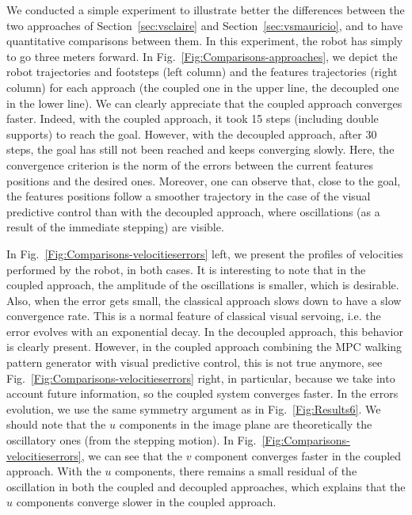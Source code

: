 We conducted a simple experiment to illustrate better the differences between the two approaches of Section~\ref{sec:vsclaire} and Section~\ref{sec:vsmauricio}, and to have quantitative comparisons between them. In this experiment, the robot has simply to go three meters forward. In Fig.~\ref{Fig:Comparisons-approaches}, we depict the robot trajectories and footsteps (left column) and the features trajectories (right column) for each approach (the coupled one in the upper line, the decoupled one in the lower line). We can clearly appreciate that the coupled approach converges faster. Indeed, with the coupled approach, it took 15 steps (including double supports) to reach the goal. However, with the decoupled approach, after 30 steps, the goal  has still not been reached and keeps converging slowly. Here, the convergence criterion is the norm of the errors between the current features positions and the desired ones. Moreover, one can observe that, close to the goal, the features positions follow a smoother trajectory in the case of the visual predictive control than with the decoupled approach, where oscillations (as a result of the immediate stepping) are visible.

In Fig.~\ref{Fig:Comparisons-velocitieserrors} left, we present the profiles of velocities performed by the robot, in both cases. It is interesting to note that in the coupled approach, the amplitude of the oscillations is smaller, which is desirable. Also, when the error gets small, the classical approach slows down to have a slow convergence rate. This is a normal feature of classical visual servoing, i.e. the error evolves with an exponential decay. In the decoupled approach, this behavior is clearly present. However, in the coupled approach combining the MPC walking pattern generator with visual predictive control, this is not true anymore, see Fig.~\ref{Fig:Comparisons-velocitieserrors} right, in particular, because we take into account future information, so the coupled system converges faster. In the errors evolution, we use the same symmetry argument as in Fig.~\ref{Fig:Results6}. We should note that the $u$ components in the image plane are theoretically the oscillatory ones (from the stepping motion). In Fig.~\ref{Fig:Comparisons-velocitieserrors}, we can see that the $v$ component converges faster in the coupled approach. With the $u$ components, there remains a small residual of the oscillation in both the coupled and decoupled approaches, which explains that the $u$ components converge slower in the coupled approach.


